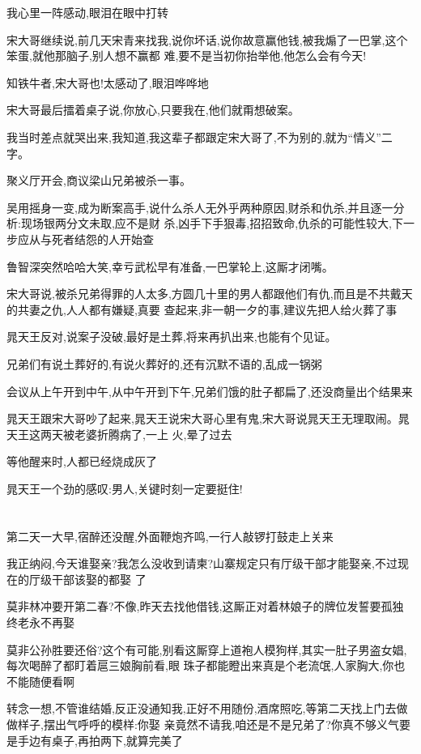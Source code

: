 ﻿\documentclass[12pt]{article}
\begin{document}
我心里一阵感动,眼泪在眼中打转

宋大哥继续说,前几天宋青来找我,说你坏话,说你故意赢他钱,被我煽了一巴掌,这个笨蛋,就他那脑子,别人想不赢都
难,要不是当初你抬举他,他怎么会有今天!

知铁牛者,宋大哥也!太感动了,眼泪哗哗地

宋大哥最后擂着桌子说,你放心,只要我在,他们就甭想破案。

我当时差点就哭出来,我知道,我这辈子都跟定宋大哥了,不为别的,就为``情义''二字。

聚义厅开会,商议梁山兄弟被杀一事。

吴用摇身一变,成为断案高手,说什么杀人无外乎两种原因,财杀和仇杀,并且逐一分析:现场银两分文未取,应不是财
杀,凶手下手狠毒,招招致命,仇杀的可能性较大,下一步应从与死者结怨的人开始查

鲁智深突然哈哈大笑,幸亏武松早有准备,一巴掌轮上,这厮才闭嘴。

宋大哥说,被杀兄弟得罪的人太多,方圆几十里的男人都跟他们有仇,而且是不共戴天的共妻之仇,人人都有嫌疑,真要
查起来,非一朝一夕的事,建议先把人给火葬了事

晁天王反对,说案子没破,最好是土葬,将来再扒出来,也能有个见证。

兄弟们有说土葬好的,有说火葬好的,还有沉默不语的,乱成一锅粥

会议从上午开到中午,从中午开到下午,兄弟们饿的肚子都扁了,还没商量出个结果来

晁天王跟宋大哥吵了起来,晁天王说宋大哥心里有鬼,宋大哥说晁天王无理取闹。晁天王这两天被老婆折腾病了,一上
火,晕了过去

等他醒来时,人都已经烧成灰了

晁天王一个劲的感叹:男人,关键时刻一定要挺住!
\section{}

第二天一大早,宿醉还没醒,外面鞭炮齐鸣,一行人敲锣打鼓走上关来

我正纳闷,今天谁娶亲?我怎么没收到请柬?山寨规定只有厅级干部才能娶亲,不过现在的厅级干部该娶的都娶
了\dldots

莫非林冲要开第二春?不像,昨天去找他借钱,这厮正对着林娘子的牌位发誓要孤独终老永不再娶\dldots

莫非公孙胜要还俗?这个有可能,别看这厮穿上道袍人模狗样,其实一肚子男盗女娼,每次喝醉了都盯着扈三娘胸前看,眼
珠子都能瞪出来\dldots 真是个老流氓,人家胸大,你也不能随便看啊\dldots

转念一想,不管谁结婚,反正没通知我,正好不用随份,酒席照吃,等第二天找上门去做做样子,摆出气呼呼的模样:你娶
亲竟然不请我,咱还是不是兄弟了?\dldots 你真不够义气\dldots 要是手边有桌子,再拍两下,就算完美了
\end{document}
